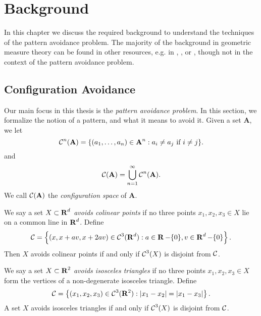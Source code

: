
\chapter{Background}
\label{ch:Background}

In this chapter we discuss the required background to understand the techniques of the pattern avoidance problem. The majority of the background in geometric measure theory can be found in other resources, e.g. in \cite{Falconer}, \cite{MattilaGeomMeasure}, or \cite{TaoHausdorff}, though not in the context of the pattern avoidance problem.

\section{Configuration Avoidance}

Our main focus in this thesis is the \emph{pattern avoidance problem}. In this section, we formalize the notion of a pattern, and what it means to avoid it. Given a set $\mathbf{A}$, we let
%
\[ \operatorname{\mathcal{C}}^n(\operatorname{\mathbf{A}}) = \{ (a_1, \dots, a_n) \in \operatorname{\mathbf{A}}^n: a_i \neq a_j\ \text{if $i \neq j$} \}. \]
%
and
%
\[ \operatorname{\mathcal{C}}(\operatorname{\mathbf{A}}) = \bigcup_{n = 1}^\infty \operatorname{\mathcal{C}}^n(\operatorname{\mathbf{A}}). \]
%
We call $\operatorname{\mathcal{C}}(\operatorname{\mathbf{A}})$ the \emph{configuration space} of $\mathbf{A}$.

\begin{example}
	We say a set $X \subset \operatorname{\mathbf{R}}^d$ \emph{avoids colinear points} if no three points $x_1,x_2,x_3 \in X$ lie on a common line in $\operatorname{\mathbf{R}}^d$. Define
	\[ \operatorname{\mathcal{C}} = \left\{ (x, x + av, x + 2av) \in \operatorname{\mathcal{C}}^3(\operatorname{\mathbf{R}}^d) : a \in \operatorname{\mathbf{R}} - \{ 0 \}, v \in \operatorname{\mathbf{R}}^d - \{ 0 \} \right\}. \]
	Then $X$ avoids colinear points if and only if $\operatorname{\mathcal{C}}^3(X)$ is disjoint from $\operatorname{\mathcal{C}}$.
\end{example}

\begin{example}
	We say a set $X \subset \operatorname{\mathbf{R}}^2$ \emph{avoids isosceles triangles} if no three points $x_1,x_2,x_3 \in X$ form the vertices of a non-degenerate isosceles triangle. Define
	\[ \operatorname{\mathcal{C}} = \left\{ (x_1, x_2, x_3) \in \operatorname{\mathcal{C}}^3(\operatorname{\mathbf{R}}^2) : |x_1-x_2| = |x_1-x_3| \right\}. \]
	A set $X$ avoids isosceles triangles if and only if $\operatorname{\mathcal{C}}^3(X)$ is disjoint from $\operatorname{\mathcal{C}}$. %
\end{example}

